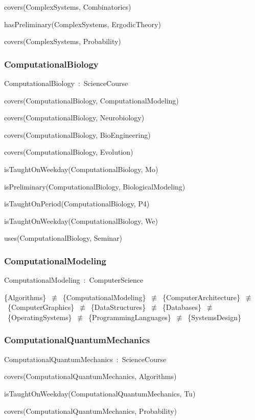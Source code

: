 \documentclass{article}
\begin{document}
covers(ComplexSystems, Combinatorics)

hasPreliminary(ComplexSystems, ErgodicTheory)

covers(ComplexSystems, Probability)

\subsubsection*{ComputationalBiology}

ComputationalBiology~:~ScienceCourse

covers(ComputationalBiology, ComputationalModeling)

covers(ComputationalBiology, Neurobiology)

covers(ComputationalBiology, BioEngineering)

covers(ComputationalBiology, Evolution)

isTaughtOnWeekday(ComputationalBiology, Mo)

isPreliminary(ComputationalBiology, BiologicalModeling)

isTaughtOnPeriod(ComputationalBiology, P4)

isTaughtOnWeekday(ComputationalBiology, We)

uses(ComputationalBiology, Seminar)

\subsubsection*{ComputationalModeling}

ComputationalModeling~:~ComputerScience

\{Algorithms\}~\ensuremath{\not\equiv}~\{ComputationalModeling\}~\ensuremath{\not\equiv}~\{ComputerArchitecture\}~\ensuremath{\not\equiv}~\{ComputerGraphics\}~\ensuremath{\not\equiv}~\{DataStructures\}~\ensuremath{\not\equiv}~\{Databases\}~\ensuremath{\not\equiv}~\{OperatingSystems\}~\ensuremath{\not\equiv}~\{ProgrammingLanguages\}~\ensuremath{\not\equiv}~\{SystemsDesign\}

\subsubsection*{ComputationalQuantumMechanics}

ComputationalQuantumMechanics~:~ScienceCourse

covers(ComputationalQuantumMechanics, Algorithms)

isTaughtOnWeekday(ComputationalQuantumMechanics, Tu)

covers(ComputationalQuantumMechanics, Probability)
\end{document}
